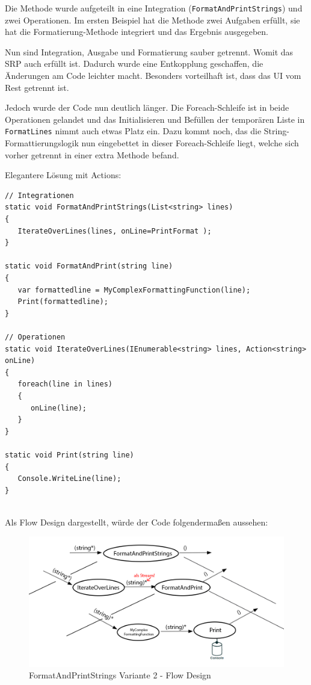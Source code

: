 Die Methode wurde aufgeteilt in eine Integration (\texttt{FormatAndPrintStrings}) und zwei Operationen.
Im ersten Beispiel hat die Methode zwei Aufgaben erfüllt, sie hat die Formatierung-Methode integriert und
das Ergebnis ausgegeben.

Nun sind Integration, Ausgabe und Formatierung sauber getrennt.
Womit das SRP auch erfüllt ist. Dadurch wurde eine Entkopplung geschaffen, 
die Änderungen am Code leichter macht. Besonders vorteilhaft ist, dass das UI vom Rest getrennt ist. 

Jedoch wurde der Code nun deutlich länger. Die Foreach-Schleife ist in beide Operationen gelandet und das Initialisieren und
Befüllen der temporären Liste in \texttt{FormatLines} nimmt auch etwas Platz ein.
Dazu kommt noch, das die String-Formattierungslogik nun eingebettet in dieser Foreach-Schleife liegt, welche sich vorher getrennt in
einer extra Methode  befand.

\bigskip

Elegantere Lösung mit Actions:

\begin{lstlisting}[caption=FormatAndPrintStrings Variante 2]
// Integrationen
static void FormatAndPrintStrings(List<string> lines)
{
   IterateOverLines(lines, onLine=PrintFormat );
}

static void FormatAndPrint(string line)
{
   var formattedline = MyComplexFormattingFunction(line);
   Print(formattedline);
}

// Operationen
static void IterateOverLines(IEnumerable<string> lines, Action<string> onLine)
{
   foreach(line in lines)
   {
      onLine(line);
   }
}

static void Print(string line)
{
   Console.WriteLine(line);
}


\end{lstlisting}

Als Flow Design dargestellt, würde der Code folgendermaßen aussehen:

\begin{figure}[H]
	\centering
	\includegraphics[width=1\linewidth]{./img/FlowsForeach.png}
	\caption{FormatAndPrintStrings Variante 2 - Flow Design}
\end{figure}



